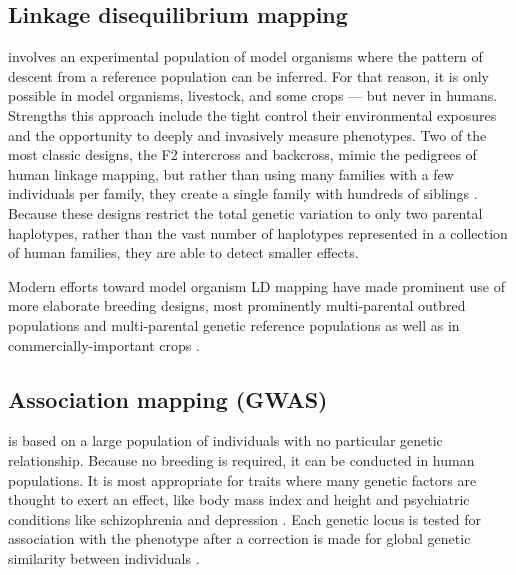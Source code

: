 \subsection{Linkage disequilibrium mapping} involves an experimental population of model organisms where the pattern of descent from a reference population can be inferred.
	For that reason, it is only possible in model organisms, livestock, and some crops --- but never in humans.
	Strengths this approach include the tight control their environmental exposures and the opportunity to deeply and invasively measure phenotypes.
	Two of the most classic designs, the F2 intercross and backcross, mimic the pedigrees of human linkage mapping, but rather than using many families with a few individuals per family, they create a single family with hundreds of siblings \citep{Lynch1998,Lander1987,Lander1989a}.
	Because these designs restrict the total genetic variation to only two parental haplotypes, rather than the vast number of haplotypes represented in a collection of human families, they are able to detect smaller effects.

	Modern efforts toward model organism LD mapping have made prominent use of more elaborate breeding designs, most prominently multi-parental outbred populations \citep{Ghazalpour2012b,Svenson2012a} and multi-parental genetic reference populations \citep{TheComplexTraitConsortium2004,MacKay2012,King2012} as well as in commercially-important crops \citep{McMullen2009,Bandillo2013}.


\subsection{Association mapping (GWAS)} is based on a large population of individuals with no particular genetic relationship.
	Because no breeding is required, it can be conducted in human populations.
	It is most appropriate for traits where many genetic factors are thought to exert an effect, like body mass index \citep{Speliotes2010,Locke2015} and height \citep{Allen2010,Wood2014-fh} and psychiatric conditions like schizophrenia \citep{Ripke2014a} and depression \citep{PGC2017}.
	Each genetic locus is tested for association with the phenotype after a correction is made for global genetic similarity between individuals \citep{Lippert2011,Zhou2012}.


